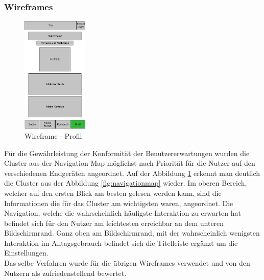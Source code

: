 \subsubsection{Wireframes}
\begin{figure}
  \centering
    \includegraphics[width=0.28\textwidth]{images/wf-profil.jpg}
  \centering
\caption[Wireframe - Profil]{Wireframe - Profil}
\label{fig:wf-profil}
\end{figure}
Für die Gewährleistung der Konformität der Benutzererwartungen wurden die Cluster aus der Navigation Map möglichst nach Priorität für die Nutzer auf den verschiedenen Endgeräten angeordnet. Auf der Abbildung \ref{fig:wf-profil} erkennt man deutlich die Cluster aus der Abbildung \ref{fig:navigationmap} wieder. Im oberen Bereich, welcher auf den ersten Blick am besten gelesen werden kann, sind die Informationen die für das Cluster am wichtigsten waren, angeordnet. Die Navigation, welche die wahrscheinlich häufigste Interaktion zu erwarten hat befindet sich für den Nutzer am leichtesten erreichbar an dem unteren Bildschirmrand. Ganz oben am Bildschirmrand, mit der wahrscheinlich wenigsten Interaktion im Alltagsgebrauch befindet sich die Titelleiste ergänzt um die Einstellungen. \\ Das selbe Verfahren wurde für die übrigen Wireframes verwendet und von den Nutzern als zufriedenstellend bewertet. \\

